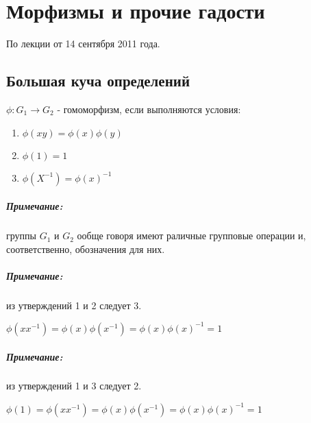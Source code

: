 \chapter{Морфизмы и прочие гадости}

По лекции от 14 сентября 2011 года.

\section{Большая куча определений}

\begin{Def}
	$\phi : G_1 \rightarrow G_2$ - гомоморфизм, если выполняются условия:
	\begin{enumerate}
		\item $\phi \left( xy \right) = \phi \left( x \right) \phi \left( y \right)$

		\item $\phi \left( 1 \right) = 1$

		\item $\phi \left( X^{-1} \right) = \phi \left( x \right) ^{-1}$
	\end{enumerate}
\end{Def}

\paragraph{Примечание:} группы $G_1$ и $G_2$ ообще говоря имеют раличные групповые операции и, соответственно, обозначения для них.

\paragraph{Примечание:} из утверждений 1 и 2 следует 3.
\begin{Proof}
	$\phi \left(x x^{-1}\right) = \phi \left( x \right) \phi \left( x^{-1} \right) = \phi \left(x\right) \phi \left(x\right)^{-1} = 1$
\end{Proof}

\paragraph{Примечание:} из утверждений 1 и 3 следует 2.
\begin{Proof}
	$\phi \left(1\right) = \phi \left(x x^{-1}\right) = \phi \left( x \right) \phi \left( x^{-1} \right) = \phi \left(x\right) \phi \left(x\right)^{-1} = 1$
\end{Proof}

